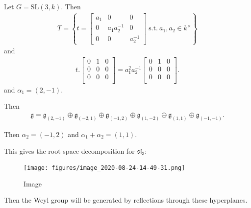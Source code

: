 \begin{example}

\begin{example}

Let \(G = {\text{SL}}(3, k)\). Then
\begin{align*}   T = \left\{{ t =  \begin{bmatrix} a_1 & 0 & 0 \\ 0 & a_1 a_2^{-1}  & 0\\ 0 & 0 & a_2^{-1}  \end{bmatrix} ~{\text{s.t.}}~ a_1, a_2\in k^{\times} }\right\} \end{align*}
and
\begin{align*}   t. \begin{bmatrix} 0 & 1 & 0 \\ 0 & 0 & 0 \\ 0 & 0 & 0 \\ \end{bmatrix} =  a_1^2 a_2^{-1}  \begin{bmatrix} 0 & 1 & 0 \\ 0 & 0 & 0 \\ 0 & 0 & 0 \\ \end{bmatrix} .\end{align*}
and \(\alpha_1 = (2, -1)\).


Then
\begin{align*}   {\mathfrak{g}}=  {\mathfrak{g}}_{(2, -1)} \oplus {\mathfrak{g}}_{(-2, 1)} \oplus {\mathfrak{g}}_{(-1, 2)} \oplus {\mathfrak{g}}_{(1, -2)} \oplus {\mathfrak{g}}_{(1, 1)} \oplus {\mathfrak{g}}_{(-1, -1)} .\end{align*}

Then \(\alpha_2 = (-1, 2)\) and \(\alpha_1 + \alpha_2 = ( 1, 1)\).

This gives the root space decomposition for \({\mathfrak{sl}}_3\):

\begin{figure}
\centering
\texttt{[image: figures/image\_2020-08-24-14-49-31.png]}
\caption{Image}
\end{figure}

Then the Weyl group will be generated by reflections through these
hyperplanes.

\end{example}

\end{example}

